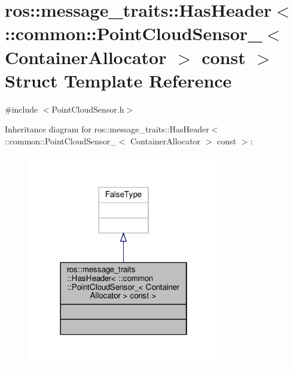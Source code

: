 \hypertarget{structros_1_1message__traits_1_1HasHeader_3_01_1_1common_1_1PointCloudSensor___3_01ContainerAllocator_01_4_01const_01_4}{}\section{ros\+:\+:message\+\_\+traits\+:\+:Has\+Header$<$ \+:\+:common\+:\+:Point\+Cloud\+Sensor\+\_\+$<$ Container\+Allocator $>$ const $>$ Struct Template Reference}
\label{structros_1_1message__traits_1_1HasHeader_3_01_1_1common_1_1PointCloudSensor___3_01ContainerAllocator_01_4_01const_01_4}


{\ttfamily \#include $<$Point\+Cloud\+Sensor.\+h$>$}



Inheritance diagram for ros\+:\+:message\+\_\+traits\+:\+:Has\+Header$<$ \+:\+:common\+:\+:Point\+Cloud\+Sensor\+\_\+$<$ Container\+Allocator $>$ const $>$\+:\nopagebreak
\begin{figure}[H]
\begin{center}
\leavevmode
\includegraphics[width=238pt]{d9/d7d/structros_1_1message__traits_1_1HasHeader_3_01_1_1common_1_1PointCloudSensor___3_01ContainerAllo954cfe961a0b07e7d56704094c3e5a5f}
\end{center}
\end{figure}


